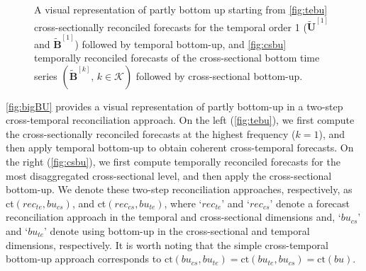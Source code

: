 \documentclass[12pt]{article}
\newcommand{\Bvet}{\bm{B}}
\newcommand{\Uvet}{\bm{U}}
\theoremstyle{definition}
\begin{document}
\begin{figure}[!t]
\begin{subfigure}[b]{0.49\textwidth}
{}
		\label{fig:csbu}
	\end{subfigure}
	\vspace{-0.25cm}
	\caption{A visual representation of partly bottom up starting from \eqref{fig:tebu} cross-sectionally reconciled forecasts for the temporal order 1 ($\widetilde{\Uvet}^{[1]}$ and $\widetilde{\Bvet}^{[1]}$) followed by temporal bottom-up, and \eqref{fig:csbu} temporally reconciled forecasts of the cross-sectional bottom time series $(\widetilde{\Bvet}^{[k]}, \, k\in \mathcal{K})$ followed by cross-sectional bottom-up. %
	}
	\label{fig:bigBU}
	\vspace*{-0.5\baselineskip}
\end{figure}

\autoref{fig:bigBU} provides a visual representation of partly bottom-up in a two-step cross-temporal reconciliation approach. On the left (\autoref{fig:tebu}), we first compute the cross-sectionally reconciled forecasts at the highest frequency ($k = 1$), and then apply temporal bottom-up to obtain coherent cross-temporal forecasts. On the right (\autoref{fig:csbu}), we first compute temporally reconciled forecasts for the most disaggregated cross-sectional level, and then apply the cross-sectional bottom-up. We denote these two-step reconciliation approaches, respectively, as ct$(rec_{te},bu_{cs})$, and ct$(rec_{cs},bu_{te})$, where ‘$rec_{te}$’ and ‘$rec_{cs}$’ denote a forecast reconciliation approach in the temporal and cross-sectional dimensions and, ‘$bu_{cs}$’ and ‘$bu_{te}$’ denote using bottom-up in the cross-sectional and temporal dimensions, respectively. It is worth noting that the simple cross-temporal bottom-up approach corresponds to $\mathrm{ct}(bu_{cs}, bu_{te})=\mathrm{ct}(bu_{te}, bu_{cs})=\mathrm{ct}(bu)$.
\end{document}

